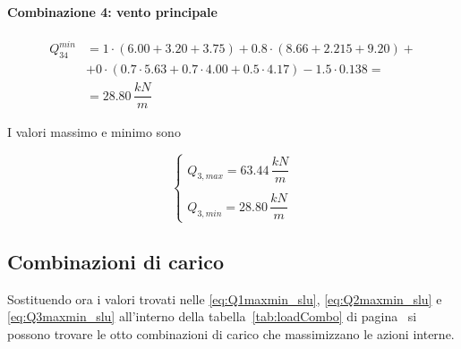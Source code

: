 \paragraph{Combinazione 4: vento principale}

\begin{align*}
	Q_{34}^{min} &= 1\cdot(6.00+3.20 + 3.75) + 0.8\cdot(8.66+2.215 + 9.20) +\\
	&+0\cdot(0.7 \cdot 5.63 + 0.7\cdot4.00+ 0.5\cdot4.17) - 1.5\cdot 0.138 =\\
	&=  28.80\,\dfrac{kN}{m}
\end{align*}

I valori massimo e minimo sono

\begin{equation}
		\label{eq:Q3maxmin_slu}
		\begin{cases}
			Q_{3,max} = 63.44\,\dfrac{kN}{m}\\\\
			Q_{3, min} = 28.80\,\dfrac{kN}{m}
		\end{cases}
\end{equation}

\subsection{Combinazioni di carico}\label{sec:loadCombo}
Sostituendo ora i valori trovati nelle \eqref{eq:Q1maxmin_slu}, \eqref{eq:Q2maxmin_slu} e \eqref{eq:Q3maxmin_slu} all'interno della tabella~\ref{tab:loadCombo} di pagina~\pageref{tab:loadCombo} si possono trovare le otto combinazioni di carico che massimizzano le azioni interne.

